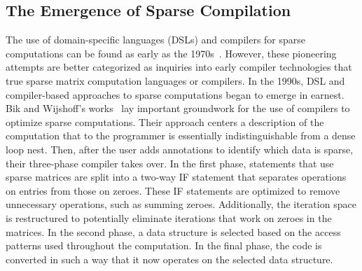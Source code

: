 \subsection{The Emergence of Sparse Compilation}

The use of domain-specific languages (DSLs) and compilers for sparse computations can be found as early as the 1970s~\cite{calahan1971description,mchugh1974simpl}.
However, these pioneering attempts are better categorized as inquiries into early compiler technologies that true sparse matrix computation languages or compilers. 
In the 1990s, DSL and compiler-based approaches to sparse computations began to emerge in earnest.
Bik and Wijshoff's works~\cite{bik1993compilation, bik1993automatic,bik1996automatic} lay important groundwork for the use of compilers to optimize sparse computations.
Their approach centers a description of the computation that to the programmer is essentially indistinguishable from a dense loop nest. 
Then, after the user adds annotations to identify which data is sparse, their three-phase compiler takes over.
In the first phase, statements that use sparse matrices are split into a two-way IF statement that separates operations on entries from those on zeroes. 
These IF statements are optimized to remove unnecessary operations, such as summing zeroes.
Additionally, the iteration space is restructured to potentially eliminate iterations that work on zeroes in the matrices. 
In the second phase, a  data structure is selected based on the access patterns used throughout the computation. 
In the final phase, the code is converted in such a way that it now operates on the selected data structure.

